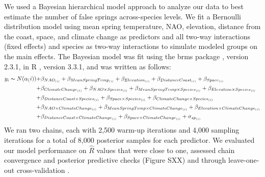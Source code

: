 \documentclass{article}\usepackage[]{graphicx}\usepackage[]{color}
\begin{document}
We used a Bayesian hierarchical model approach to analyze our data to best estimate the number of false springs across-species levels. We fit a Bernoulli distribution model using mean spring temperature, NAO, elevation, distance from the coast, space, and climate change as predictors and all two-way interactions (fixed effects) and species as two-way interactions to simulate modeled groups on the main effects. The Bayesian model was fit using the brms package \citep{brms}, version 2.3.1,  in R \citep{R}, version 3.3.1, and was written as follows: 
\begin{align*} \label{eq:1} 
y_i \thicksim N(\alpha_(i)) +&  \beta_{NAO_{(i)}} + \beta_{MeanSpringTemp_{(i)}} + \beta_{Elevation_{(i)}} + \beta_{DistanceCoast_{(i)}} + \beta_{Space_{(i)}} \\ +& \beta_{ClimateChange_{(i)}}
+ \beta_{NAO \times Species_{(i)}} + \beta_{MeanSpringTemp \times Species_{(i)}} + \beta_{Elevation \times Species_{(i)}} \\ +& \beta_{DistanceCoast \times Species_{(i)}} + \beta_{Space \times Species_{(i)}} + \beta_{ClimateChange \times Species_{(i)}} \\
+& \beta_{NAO \times ClimateChange_{(i)}} + \beta_{MeanSpringTemp \times ClimateChange_{(i)}} 
+ \beta_{Elevation \times ClimateChange_{(i)}} \\ +& \beta_{DistanceCoast \times ClimateChange_{(i)}} + \beta_{Space \times ClimateChange_{(i)}} + \sigma_{sp_{(i)}} 
\end{align*}
We ran two chains, each with 2,500 warm-up iterations and 4,000 sampling iterations for a total of 8,000 posterior samples for each predictor. We evaluated our model performance on $\hat{R}$ values that were close to one, assessed chain convergence and posterior predictive checks (Figure SXX) and through leave-one-out cross-validation \citep{Gelman2006}.

\end{document}

